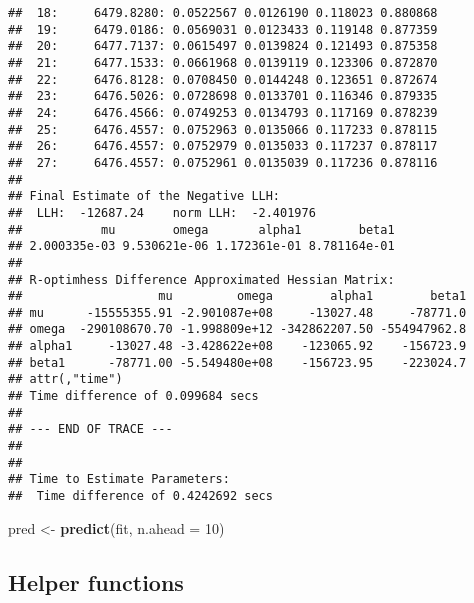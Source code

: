 \documentclass[
]{article}
\newenvironment{Shaded}{\begin{snugshade}}{\end{snugshade}}
\newcommand{\AttributeTok}[1]{\textcolor[rgb]{0.13,0.29,0.53}{#1}}
\newcommand{\DecValTok}[1]{\textcolor[rgb]{0.00,0.00,0.81}{#1}}
\newcommand{\FunctionTok}[1]{\textcolor[rgb]{0.13,0.29,0.53}{\textbf{#1}}}
\newcommand{\NormalTok}[1]{#1}
\newcommand{\OtherTok}[1]{\textcolor[rgb]{0.56,0.35,0.01}{#1}}
\begin{document}
\begin{verbatim}
##  18:     6479.8280: 0.0522567 0.0126190 0.118023 0.880868
##  19:     6479.0186: 0.0569031 0.0123433 0.119148 0.877359
##  20:     6477.7137: 0.0615497 0.0139824 0.121493 0.875358
##  21:     6477.1533: 0.0661968 0.0139119 0.123306 0.872870
##  22:     6476.8128: 0.0708450 0.0144248 0.123651 0.872674
##  23:     6476.5026: 0.0728698 0.0133701 0.116346 0.879335
##  24:     6476.4566: 0.0749253 0.0134793 0.117169 0.878239
##  25:     6476.4557: 0.0752963 0.0135066 0.117233 0.878115
##  26:     6476.4557: 0.0752979 0.0135033 0.117237 0.878117
##  27:     6476.4557: 0.0752961 0.0135039 0.117236 0.878116
## 
## Final Estimate of the Negative LLH:
##  LLH:  -12687.24    norm LLH:  -2.401976 
##           mu        omega       alpha1        beta1 
## 2.000335e-03 9.530621e-06 1.172361e-01 8.781164e-01 
## 
## R-optimhess Difference Approximated Hessian Matrix:
##                   mu         omega        alpha1        beta1
## mu      -15555355.91 -2.901087e+08     -13027.48     -78771.0
## omega  -290108670.70 -1.998809e+12 -342862207.50 -554947962.8
## alpha1     -13027.48 -3.428622e+08    -123065.92    -156723.9
## beta1      -78771.00 -5.549480e+08    -156723.95    -223024.7
## attr(,"time")
## Time difference of 0.099684 secs
## 
## --- END OF TRACE ---
## 
## 
## Time to Estimate Parameters:
##  Time difference of 0.4242692 secs
\end{verbatim}

\begin{Shaded}
\begin{Highlighting}[]
\NormalTok{pred }\OtherTok{\textless{}{-}} \FunctionTok{predict}\NormalTok{(fit, }\AttributeTok{n.ahead =} \DecValTok{10}\NormalTok{)}
\end{Highlighting}
\end{Shaded}

\hypertarget{helper-functions}{%
\subsection{Helper functions}\label{helper-functions}}
\end{document}
